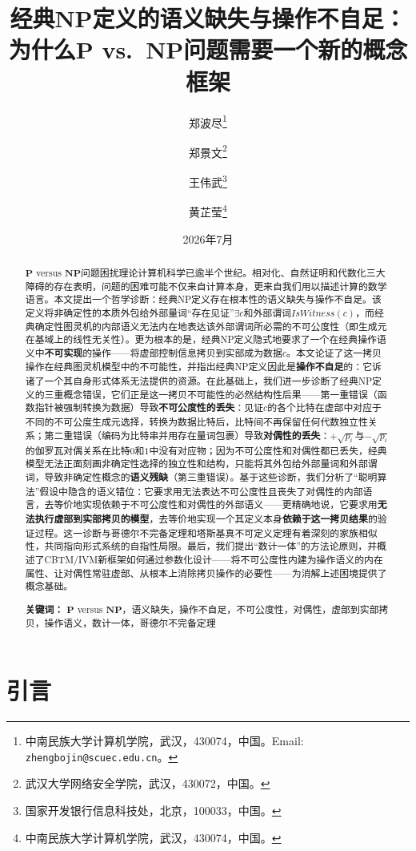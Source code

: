\documentclass{ctexart}
\title{\bfseries 经典NP定义的语义缺失与操作不自足：\\
	为什么P vs.\ NP问题需要一个新的概念框架}
\author{郑波尽\thanks{中南民族大学计算机学院，武汉，430074，中国。Email: \texttt{zhengbojin@scuec.edu.cn}。}
	\and 郑景文\thanks{武汉大学网络安全学院，武汉，430072，中国。}
	\and 王伟武\thanks{国家开发银行信息科技处，北京，100033，中国。}
	\and 黄芷莹\thanks{中南民族大学计算机学院，武汉，430074，中国。}
}
\date{2026年7月}
\begin{document}
	
	\maketitle
	
	\begin{abstract}
		$\mathbf{P}$ versus $\mathbf{NP}$问题困扰理论计算机科学已逾半个世纪。相对化、自然证明和代数化三大障碍的存在表明，问题的困难可能不仅来自计算本身，更来自我们用以描述计算的数学语言。本文提出一个哲学诊断：经典NP定义存在根本性的语义缺失与操作不自足。该定义将非确定性的本质外包给外部量词``存在见证''$\exists c$和外部谓词$IsWitness(c)$，而经典确定性图灵机的内部语义无法内在地表达该外部谓词所必需的不可公度性（即生成元在基域上的线性无关性）。更为根本的是，经典NP定义隐式地要求了一个在经典操作语义中\textbf{不可实现}的操作——将虚部控制信息拷贝到实部成为数据$c$。本文论证了这一拷贝操作在经典图灵机模型中的不可能性，并指出经典NP定义因此是\textbf{操作不自足}的：它诉诸了一个其自身形式体系无法提供的资源。在此基础上，我们进一步诊断了经典NP定义的三重概念错误，它们正是这一拷贝不可能性的必然结构性后果——第一重错误（函数指针被强制转换为数据）导致\textbf{不可公度性的丢失}：见证$c$的各个比特在虚部中对应于不同的不可公度生成元选择，转换为数据比特后，比特间不再保留任何代数独立性关系；第二重错误（编码为比特串并用存在量词包裹）导致\textbf{对偶性的丢失}：$+\sqrt{p_i}$与$-\sqrt{p_i}$的伽罗瓦对偶关系在比特$0$和$1$中没有对应物；因为不可公度性和对偶性都已丢失，经典模型无法正面刻画非确定性选择的独立性和结构，只能将其外包给外部量词和外部谓词，导致非确定性概念的\textbf{语义残缺}（第三重错误）。基于这些诊断，我们分析了``聪明算法''假设中隐含的语义错位：它要求用无法表达不可公度性且丧失了对偶性的内部语言，去等价地实现依赖于不可公度性和对偶性的外部语义——更精确地说，它要求用\textbf{无法执行虚部到实部拷贝的模型}，去等价地实现一个其定义本身\textbf{依赖于这一拷贝结果}的验证过程。这一诊断与哥德尔不完备定理和塔斯基真不可定义定理有着深刻的家族相似性，共同指向形式系统的自指性局限。最后，我们提出``数计一体''的方法论原则，并概述了CBTM/IVM新框架如何通过参数化设计——将不可公度性内建为操作语义的内在属性、让对偶性常驻虚部、从根本上消除拷贝操作的必要性——为消解上述困境提供了概念基础。
		
		\vspace{0.5cm}
		\noindent \textbf{关键词：} $\mathbf{P}$ versus $\mathbf{NP}$，语义缺失，操作不自足，不可公度性，对偶性，虚部到实部拷贝，操作语义，数计一体，哥德尔不完备定理
	\end{abstract}
	
	\section{引言}
	
\end{document}

